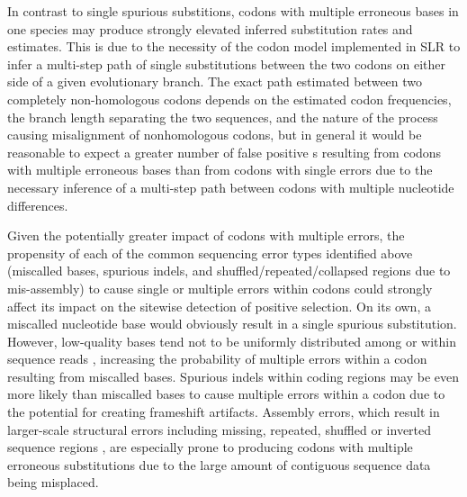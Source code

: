 In contrast to single spurious substitions, codons with multiple
erroneous bases in one species may produce strongly elevated inferred
substitution rates and \omg estimates. This is due to the necessity of
the codon model implemented in SLR to infer a multi-step path of
single substitutions between the two codons on either side of a given
evolutionary branch. The exact \ml path estimated between two
completely non-homologous codons depends on the estimated codon
frequencies, the branch length separating the two sequences, and the
nature of the process causing misalignment of nonhomologous codons,
but in general it would be reasonable to expect a greater number of
false positive \pss{}s resulting from codons with multiple erroneous
bases than from codons with single errors due to the necessary
inference of a multi-step path between codons with multiple nucleotide
differences.

Given the potentially greater impact of codons with multiple errors,
the propensity of each of the common sequencing error types identified
above (miscalled bases, spurious indels, and
shuffled/repeated/collapsed regions due to mis-assembly) to cause
single or multiple errors within codons could strongly affect its
impact on the sitewise detection of positive selection. On its own, a
miscalled nucleotide base would obviously result in a single spurious
substitution. However, low-quality bases tend not to be uniformly
distributed among or within sequence reads \citep{Kircher2009},
increasing the probability of multiple errors within a codon resulting
from miscalled bases. Spurious indels within coding regions may be
even more likely than miscalled bases to cause multiple errors within
a codon due to the potential for creating frameshift
artifacts. Assembly errors, which result in larger-scale structural
errors including missing, repeated, shuffled or inverted sequence
regions \citep{Jaffe2003}, are especially prone to producing codons
with multiple erroneous substitutions due to the large amount of
contiguous sequence data being misplaced.

